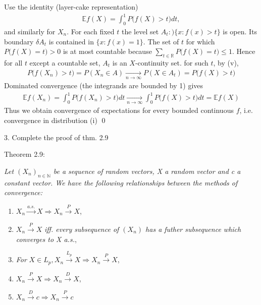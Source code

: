 \documentclass[10pt]{article}
\begin{document}
\begin{enumerate}[label=\textit{(\roman*)}]
    Use the identity (layer-cake representation)
    \begin{gather*}
        \mathbb{E}f(X) = \int_{0}^{1}P\big(f(X) > t\big) dt,
    \end{gather*}
    and similarly for $X_n$. For each fixed $t$ the level set $A_t :) \{x : f(x) > t\}$ is open. Its boundary $\delta A_t$ is contained in $\{x : f(x) = 1\}$. The set of $t$ for which $P\big(f(X) = t\big) > 0$ is at most countable because $\sum_{t\in \mathbb{R}}P\big(f(X) = t \big) \leq 1$. Hence for all $t$ except a countable set, $A_t$ is an $X$-continuity set. for such $t$, by (v),
    \begin{gather*}
        P\big(f(X_n) > t \big) = P(X_n \in A) \xrightarrow[n \to \infty]{} P(X \in A_t) = P\big(f(X) > t \big)
    \end{gather*}
    Dominated convergence (the integrands are bounded by 1) gives 
    \begin{gather*}
        \mathbb{E}f(X_n) = \int_{0}^{1}P\big(f(X_n) > t \big) dt \xrightarrow[n\to\infty]{}\int_{0}^{1}P\big(f(X) > t \big) dt = \mathbb{E}f(X)
    \end{gather*}
    Thus we obtain convergence of expectations for every bounded continuous $f$, i.e. convergence in distribution (i) \qed
\end{enumerate}

\hfill

3. Complete the proof of thm. 2.9

Theorem 2.9:

\textit{Let $(X_n)_{n \in \mathbb{N}}$ be a sequence of random vectors, X a random vector and c a constant vector. We have the following relationships between the methods of convergence:}

\begin{enumerate}[label=\textit{(\roman*)}]
    \item $X_n \xrightarrow{a.s.} X \Longrightarrow X_n \xrightarrow{P} X$,
    \item $X_n \xrightarrow{P} X$ \textit{ iff. every subsequence of $(X_n)$ has a futher subsequence which converges to X a.s.},
    \item \textit{For } $X \in L_p, X_n \xrightarrow{L_p} X \Longrightarrow X_n \xrightarrow{P} X$,
    \item $X_n \xrightarrow{P} X \Longrightarrow X_n \xrightarrow{D} X$,
    \item $X_n \xrightarrow{D} c \Longrightarrow X_n \xrightarrow{P} c$
\end{enumerate}
\end{document}
